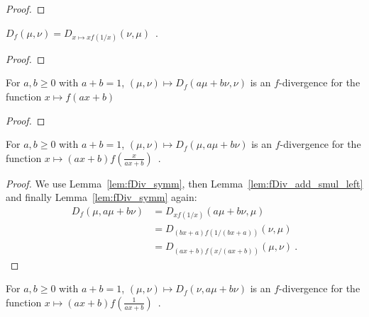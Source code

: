 \begin{proof}\leanok
\end{proof}


\begin{lemma}
  \label{lem:fDiv_symm}
  \leanok
  $D_f(\mu, \nu) = D_{x \mapsto xf(1/x)}(\nu, \mu)$~.
\end{lemma}

\begin{proof}\leanok
\uses{}

\end{proof}


\begin{lemma}
  \label{lem:fDiv_add_smul_left}
  \leanok
  For $a, b \ge 0$ with $a + b = 1$, $(\mu, \nu) \mapsto D_f(a \mu + b \nu, \nu)$ is an $f$-divergence for the function $x \mapsto f(ax + b)$
\end{lemma}

\begin{proof}\leanok
\uses{}
\end{proof}


\begin{lemma}
  \label{lem:fDiv_add_smul_right}
  \leanok
  For $a, b \ge 0$ with $a + b = 1$, $(\mu, \nu) \mapsto D_f(\mu, a \mu + b \nu)$ is an $f$-divergence for the function $x \mapsto (ax+b)f\left(\frac{x}{ax+b}\right)$~.
\end{lemma}

\begin{proof}\leanok
{}
We use Lemma~\ref{lem:fDiv_symm}, then Lemma~\ref{lem:fDiv_add_smul_left} and finally Lemma~\ref{lem:fDiv_symm} again:
\begin{align*}
D_f(\mu, a \mu + b \nu)
&= D_{xf(1/x)}(a \mu + b \nu, \mu)
\\
&= D_{(bx+a)f(1/(bx+a))}(\nu, \mu)
\\
&= D_{(ax+b)f(x/(ax+b))}(\mu, \nu)
\: .
\end{align*}

\end{proof}


\begin{lemma}
  \label{lem:fDiv_add_smul_right'}
  \leanok
  For $a, b \ge 0$ with $a + b = 1$, $(\mu, \nu) \mapsto D_f(\nu, a \mu + b \nu)$ is an $f$-divergence for the function $x \mapsto (ax+b)f\left(\frac{1}{ax+b}\right)$~.
\end{lemma}

